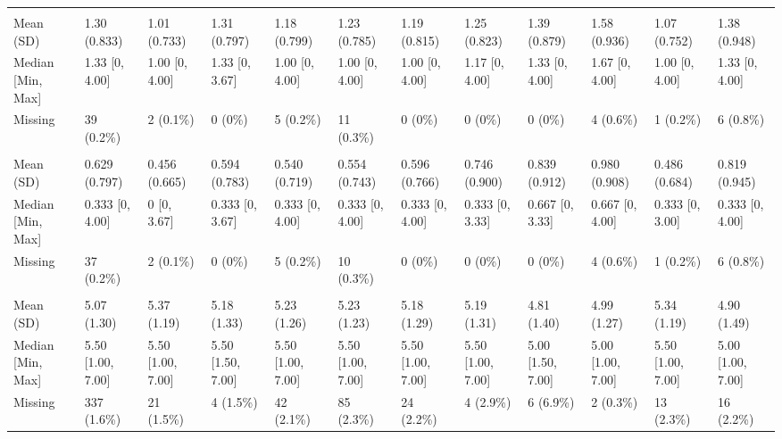\documentclass[
  single column]{article}
\begin{document}
\begin{landscape}
\begin{tabular}[t]{llllllllllll}
\addlinespace[0.3em]
\multicolumn{12}{l}{\textbf{Anxiety}}\\
\hspace{1em}Mean (SD) & 1.30 (0.833) & 1.01 (0.733) & 1.31 (0.797) & 1.18 (0.799) & 1.23 (0.785) & 1.19 (0.815) & 1.25 (0.823) & 1.39 (0.879) & 1.58 (0.936) & 1.07 (0.752) & 1.38 (0.948)\\
\hspace{1em}Median [Min, Max] & 1.33 [0, 4.00] & 1.00 [0, 4.00] & 1.33 [0, 3.67] & 1.00 [0, 4.00] & 1.00 [0, 4.00] & 1.00 [0, 4.00] & 1.17 [0, 4.00] & 1.33 [0, 4.00] & 1.67 [0, 4.00] & 1.00 [0, 4.00] & 1.33 [0, 4.00]\\
\hspace{1em}Missing & 39 (0.2\%) & 2 (0.1\%) & 0 (0\%) & 5 (0.2\%) & 11 (0.3\%) & 0 (0\%) & 0 (0\%) & 0 (0\%) & 4 (0.6\%) & 1 (0.2\%) & 6 (0.8\%)\\
\addlinespace[0.3em]
\multicolumn{12}{l}{\textbf{Depression}}\\
\hspace{1em}Mean (SD) & 0.629 (0.797) & 0.456 (0.665) & 0.594 (0.783) & 0.540 (0.719) & 0.554 (0.743) & 0.596 (0.766) & 0.746 (0.900) & 0.839 (0.912) & 0.980 (0.908) & 0.486 (0.684) & 0.819 (0.945)\\
\hspace{1em}Median [Min, Max] & 0.333 [0, 4.00] & 0 [0, 3.67] & 0.333 [0, 3.67] & 0.333 [0, 4.00] & 0.333 [0, 4.00] & 0.333 [0, 4.00] & 0.333 [0, 3.33] & 0.667 [0, 3.33] & 0.667 [0, 4.00] & 0.333 [0, 3.00] & 0.333 [0, 4.00]\\
\hspace{1em}Missing & 37 (0.2\%) & 2 (0.1\%) & 0 (0\%) & 5 (0.2\%) & 10 (0.3\%) & 0 (0\%) & 0 (0\%) & 0 (0\%) & 4 (0.6\%) & 1 (0.2\%) & 6 (0.8\%)\\
\addlinespace[0.3em]
\multicolumn{12}{l}{\textbf{Life Satisfaction}}\\
\hspace{1em}Mean (SD) & 5.07 (1.30) & 5.37 (1.19) & 5.18 (1.33) & 5.23 (1.26) & 5.23 (1.23) & 5.18 (1.29) & 5.19 (1.31) & 4.81 (1.40) & 4.99 (1.27) & 5.34 (1.19) & 4.90 (1.49)\\
\hspace{1em}Median [Min, Max] & 5.50 [1.00, 7.00] & 5.50 [1.00, 7.00] & 5.50 [1.50, 7.00] & 5.50 [1.00, 7.00] & 5.50 [1.00, 7.00] & 5.50 [1.00, 7.00] & 5.50 [1.00, 7.00] & 5.00 [1.50, 7.00] & 5.00 [1.00, 7.00] & 5.50 [1.00, 7.00] & 5.00 [1.00, 7.00]\\
\hspace{1em}Missing & 337 (1.6\%) & 21 (1.5\%) & 4 (1.5\%) & 42 (2.1\%) & 85 (2.3\%) & 24 (2.2\%) & 4 (2.9\%) & 6 (6.9\%) & 2 (0.3\%) & 13 (2.3\%) & 16 (2.2\%)\\

\end{tabular}
\end{landscape}
\end{document}
